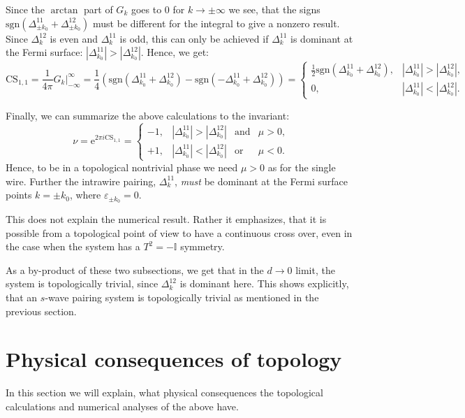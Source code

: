 Since the $\arctan$ part of $G_k$ goes to $0$ for $k\to \pm \infty$ we see, that the signs $\text{sgn}(\Delta^{11}_{\pm k_0} + \Delta^{12}_{\pm k_0})$ must be different for the integral to give a nonzero result. Since $\Delta^{12}_{k}$ is even and $\Delta^{11}_{k}$ is odd, this can only be achieved if $\Delta^{11}_{k}$ is dominant at the Fermi surface: $|\Delta^{11}_{k_0}| > |\Delta^{12}_{k_0}|$. Hence, we get:
\begin{equation}
\text{CS}_{1,1} = \frac{1}{4\pi} \left. G_k \right|^\infty_{-\infty} = \frac{1}{4}(\text{sgn}(\Delta^{11}_{k_0} + \Delta^{12}_{k_0}) - \text{sgn}(-\Delta^{11}_{k_0} + \Delta^{12}_{k_0})) = \left\{ \begin{matrix} 
\frac{1}{2}\text{sgn}(\Delta^{11}_{k_0} + \Delta^{12}_{k_0}) , & |\Delta^{11}_{k_0}| > |\Delta^{12}_{k_0}|, \\
0, & |\Delta^{11}_{k_0}| < |\Delta^{12}_{k_0}|.
  \end{matrix} \right. \nonumber 
\end{equation}

Finally, we can summarize the above calculations to the invariant:
\begin{equation}
\nu = \text{e}^{2\pi i \text{CS}_{1,1}} = \left\{ \begin{matrix} 
-1, & |\Delta^{11}_{k_0}| > |\Delta^{12}_{k_0}| & \text{and} & \mu > 0, \\
+1, & |\Delta^{11}_{k_0}| < |\Delta^{12}_{k_0}| & \text{or}  & \mu < 0.
  \end{matrix} \right.
\label{eq.CS11T2eqminus1}
\end{equation}
Hence, to be in a topological nontrivial phase we need $\mu > 0$ as for the single wire. Further the intrawire pairing, $\Delta^{11}_k$, \textit{must} be dominant at the Fermi surface points $k = \pm k_0$, where $\varepsilon_{\pm k_0} = 0$. 

This does not explain the numerical result. Rather it emphasizes, that it is possible from a topological point of view to have a continuous cross over, even in the case when the system has a $T^2 = -\mathbb{I}$ symmetry. 

As a by-product of these two subsections, we get that in the $d \to 0$ limit, the system is topologically trivial, since $\Delta^{12}_k$ is dominant here. This shows explicitly, that an $s$-wave pairing system is topologically trivial as mentioned in the previous section. 

\section{Physical consequences of topology}
In this section we will explain, what physical consequences the topological calculations and numerical analyses of the above have. 

